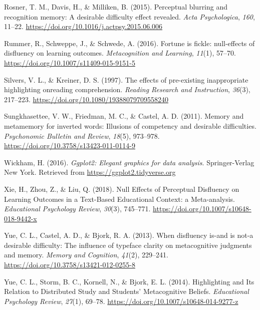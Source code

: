 \documentclass[english,doc]{apa6}
\begin{document}
\leavevmode\hypertarget{ref-Rosner2015}{}%
Rosner, T. M., Davis, H., \& Milliken, B. (2015). Perceptual blurring and recognition memory: A desirable difficulty effect revealed. \emph{Acta Psychologica}, \emph{160}, 11--22. \url{https://doi.org/10.1016/j.actpsy.2015.06.006}

\leavevmode\hypertarget{ref-Rummer2016}{}%
Rummer, R., Schweppe, J., \& Schwede, A. (2016). Fortune is fickle: null-effects of disfluency on learning outcomes. \emph{Metacognition and Learning}, \emph{11}(1), 57--70. \url{https://doi.org/10.1007/s11409-015-9151-5}

\leavevmode\hypertarget{ref-Silvers1997}{}%
Silvers, V. L., \& Kreiner, D. S. (1997). The effects of pre-existing inappropriate highlighting onreading comprehension. \emph{Reading Research and Instruction}, \emph{36}(3), 217--223. \url{https://doi.org/10.1080/19388079709558240}

\leavevmode\hypertarget{ref-Sungkhasettee2011}{}%
Sungkhasettee, V. W., Friedman, M. C., \& Castel, A. D. (2011). Memory and metamemory for inverted words: Illusions of competency and desirable difficulties. \emph{Psychonomic Bulletin and Review}, \emph{18}(5), 973--978. \url{https://doi.org/10.3758/s13423-011-0114-9}

\leavevmode\hypertarget{ref-Wickham2016}{}%
Wickham, H. (2016). \emph{Ggplot2: Elegant graphics for data analysis}. Springer-Verlag New York. Retrieved from \url{https://ggplot2.tidyverse.org}

\leavevmode\hypertarget{ref-Xie2018}{}%
Xie, H., Zhou, Z., \& Liu, Q. (2018). Null Effects of Perceptual Disfluency on Learning Outcomes in a Text-Based Educational Context: a Meta-analysis. \emph{Educational Psychology Review}, \emph{30}(3), 745--771. \url{https://doi.org/10.1007/s10648-018-9442-x}

\leavevmode\hypertarget{ref-Yue2013}{}%
Yue, C. L., Castel, A. D., \& Bjork, R. A. (2013). When disfluency is-and is not-a desirable difficulty: The influence of typeface clarity on metacognitive judgments and memory. \emph{Memory and Cognition}, \emph{41}(2), 229--241. \url{https://doi.org/10.3758/s13421-012-0255-8}

\leavevmode\hypertarget{ref-Yue2014}{}%
Yue, C. L., Storm, B. C., Kornell, N., \& Bjork, E. L. (2014). Highlighting and Its Relation to Distributed Study and Students' Metacognitive Beliefs. \emph{Educational Psychology Review}, \emph{27}(1), 69--78. \url{https://doi.org/10.1007/s10648-014-9277-z}

\endgroup

\clearpage
\theendnotes
\end{document}
